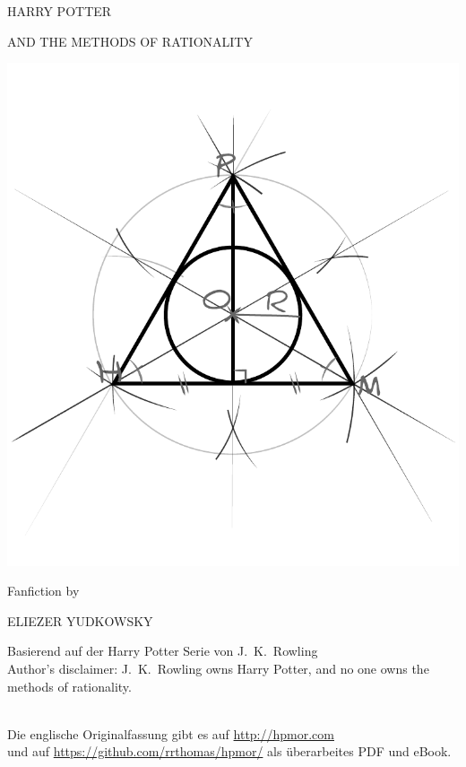 \begin{center}
\thispagestyle{empty}
{\hpfont
\Huge\MakeUppercase{Harry Potter}\vspace*{0.5cm}

\Large\MakeUppercase{and the Methods of Rationality} %

\includegraphics[scale=0.5]{images/bubble.pdf}

\vspace*{-1.0cm}
\Large Fanfiction by \vspace*{.25cm}

\huge \MakeUppercase{Eliezer Yudkowsky}%

\normalsize

\vspace*{1\baselineskip}
\fullvolumetitle{\volumenumber}
}

\vspace{0.7cm}

Basierend auf der Harry Potter Serie von J.~K.~Rowling\\
Author's disclaimer: J.~K.~Rowling owns Harry Potter, and no one owns the methods of rationality.

~\\
Die englische Originalfassung gibt es auf {\small\url{http://hpmor.com}}\\
und auf {\small\url{https://github.com/rrthomas/hpmor/}} als überarbeites PDF und eBook.\\
\end{center}



